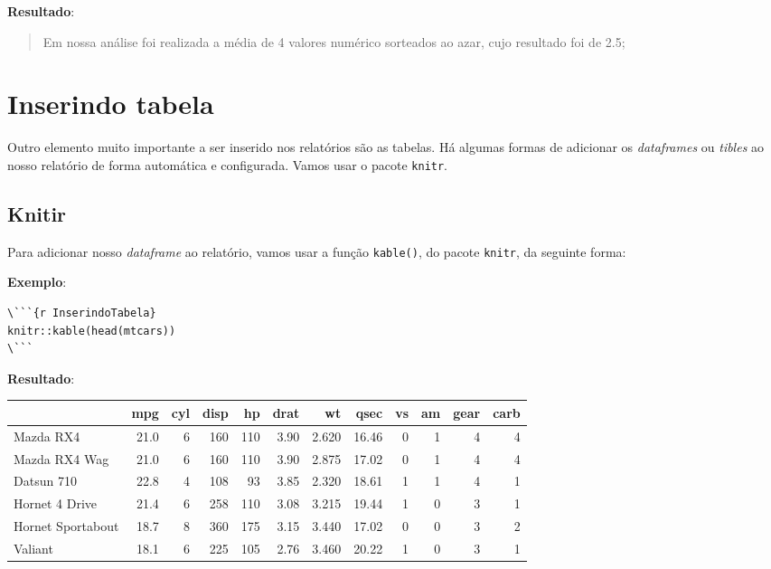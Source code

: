\documentclass[]{book}
\begin{document}
\textbf{Resultado}:

\begin{quote}
Em nossa análise foi realizada a média de 4 valores numérico sorteados ao azar, cujo resultado foi de 2.5;
\end{quote}

\hypertarget{inserindo-tabela}{%
\chapter{Inserindo tabela}\label{inserindo-tabela}}

Outro elemento muito importante a ser inserido nos relatórios são as tabelas. Há algumas formas de adicionar os \emph{dataframes} ou \emph{tibles} ao nosso relatório de forma automática e configurada. Vamos usar o pacote \texttt{knitr}.

\hypertarget{TableKnitr}{%
\section{Knitir}\label{TableKnitr}}

Para adicionar nosso \emph{dataframe} ao relatório, vamos usar a função \texttt{kable()}, do pacote \texttt{knitr}, da seguinte forma:

\textbf{Exemplo}:

\begin{verbatim}
\```{r InserindoTabela}
knitr::kable(head(mtcars))
\```
\end{verbatim}

\textbf{Resultado}:

\begin{tabular}{l|r|r|r|r|r|r|r|r|r|r|r}
\hline
  & mpg & cyl & disp & hp & drat & wt & qsec & vs & am & gear & carb\\
\hline
Mazda RX4 & 21.0 & 6 & 160 & 110 & 3.90 & 2.620 & 16.46 & 0 & 1 & 4 & 4\\
\hline
Mazda RX4 Wag & 21.0 & 6 & 160 & 110 & 3.90 & 2.875 & 17.02 & 0 & 1 & 4 & 4\\
\hline
Datsun 710 & 22.8 & 4 & 108 & 93 & 3.85 & 2.320 & 18.61 & 1 & 1 & 4 & 1\\
\hline
Hornet 4 Drive & 21.4 & 6 & 258 & 110 & 3.08 & 3.215 & 19.44 & 1 & 0 & 3 & 1\\
\hline
Hornet Sportabout & 18.7 & 8 & 360 & 175 & 3.15 & 3.440 & 17.02 & 0 & 0 & 3 & 2\\
\hline
Valiant & 18.1 & 6 & 225 & 105 & 2.76 & 3.460 & 20.22 & 1 & 0 & 3 & 1\\
\hline
\end{tabular}
\end{document}

